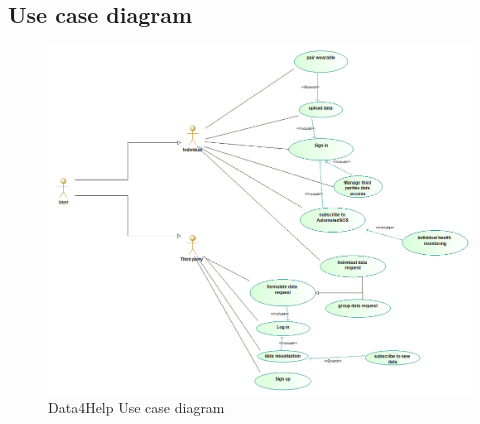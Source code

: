 \subsection{Use case diagram}
\begin{figure}[H]
  \includegraphics[width=1.10\linewidth]{resources/UML/GeneralUseCase.png}
  \caption{Data4Help Use case diagram}
  \label{fig:Use case diagram}
\end{figure}

